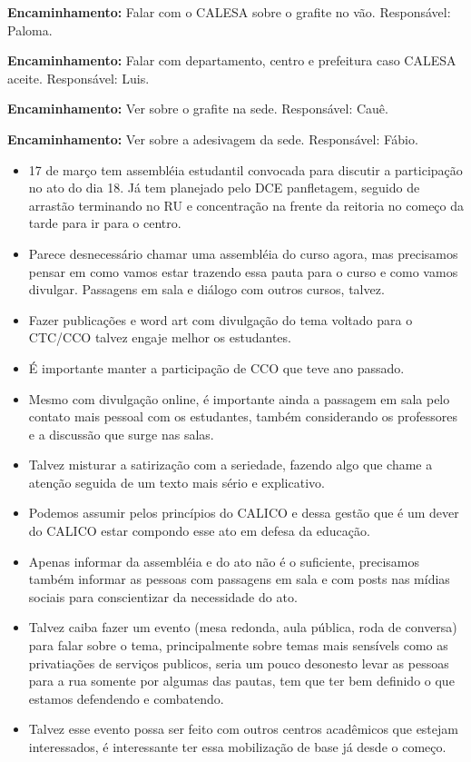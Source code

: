 \documentclass{ata-calico}
\begin{document}
\textbf{Encaminhamento:} Falar com o CALESA sobre o grafite no vão. Responsável: Paloma.

\textbf{Encaminhamento:} Falar com departamento, centro e prefeitura caso CALESA aceite. Responsável: Luis.

\textbf{Encaminhamento:} Ver sobre o grafite na sede. Responsável: Cauê.

\textbf{Encaminhamento:} Ver sobre a adesivagem da sede. Responsável: Fábio.

\begin{itemize}
\item 17 de março tem assembléia estudantil convocada para discutir a participação no ato do dia 18. Já tem planejado pelo DCE panfletagem, seguido de arrastão terminando no RU e concentração na frente da reitoria no começo da tarde para ir para o centro.
\item Parece desnecessário chamar uma assembléia do curso agora, mas precisamos pensar em como vamos estar trazendo essa pauta para o curso e como vamos divulgar. Passagens em sala e diálogo com outros cursos, talvez.
\item Fazer publicações e word art com divulgação do tema voltado para o CTC/CCO talvez engaje melhor os estudantes.
\item É importante manter a participação de CCO que teve ano passado.
\item Mesmo com divulgação online, é importante ainda a passagem em sala pelo contato mais pessoal com os estudantes, também considerando os professores e a discussão que surge nas salas.
\item Talvez misturar a satirização com a seriedade, fazendo algo que chame a atenção seguida de um texto mais sério e explicativo.
\item Podemos assumir pelos princípios do CALICO e dessa gestão que é um dever do CALICO estar compondo esse ato em defesa da educação.
\item Apenas informar da assembléia e do ato não é o suficiente, precisamos também informar as pessoas com passagens em sala e com posts nas mídias sociais para conscientizar da necessidade do ato.
\item Talvez caiba fazer um evento (mesa redonda, aula pública, roda de conversa) para falar sobre o tema, principalmente sobre temas mais sensívels como as privatiações de serviços publicos, seria um pouco desonesto levar as pessoas para a rua somente por algumas das pautas, tem que ter bem definido o que estamos defendendo e combatendo.
\item Talvez esse evento possa ser feito com outros centros acadêmicos que estejam interessados, é interessante ter essa mobilização de base já desde o começo.
\end{itemize}
\end{document}
